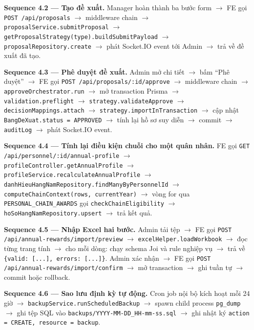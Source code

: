 \documentclass[../DoAn.tex]{subfiles}
\begin{document}
\textbf{Sequence 4.2 --- Tạo đề xuất.} Manager hoàn thành ba bước form $\rightarrow$ FE gọi \texttt{POST /api/proposals} $\rightarrow$ middleware chain $\rightarrow$ \texttt{proposalService.submitProposal} $\rightarrow$ \texttt{getProposalStrategy(type).buildSubmitPayload} $\rightarrow$ \texttt{proposalRepository.create} $\rightarrow$ phát Socket.IO event tới Admin $\rightarrow$ trả về đề xuất đã tạo.

\textbf{Sequence 4.3 --- Phê duyệt đề xuất.} Admin mở chi tiết $\rightarrow$ bấm ``Phê duyệt'' $\rightarrow$ FE gọi \texttt{POST /api/proposals/:id/approve} $\rightarrow$ middleware chain $\rightarrow$ \texttt{approveOrchestrator.run} $\rightarrow$ mở transaction Prisma $\rightarrow$ \texttt{validation.preflight} $\rightarrow$ \texttt{strategy.validateApprove} $\rightarrow$ \texttt{decisionMappings.attach} $\rightarrow$ \texttt{strategy.importInTransaction} $\rightarrow$ cập nhật \texttt{BangDeXuat.status = APPROVED} $\rightarrow$ tính lại hồ sơ suy diễn $\rightarrow$ commit $\rightarrow$ \texttt{auditLog} $\rightarrow$ phát Socket.IO event.

\textbf{Sequence 4.4 --- Tính lại điều kiện chuỗi cho một quân nhân.} FE gọi \texttt{GET /api/personnel/:id/annual-profile} $\rightarrow$ \texttt{profileController.getAnnualProfile} $\rightarrow$ \texttt{profileService.recalculateAnnualProfile} $\rightarrow$ \texttt{danhHieuHangNamRepository.findManyByPersonnelId} $\rightarrow$ \texttt{computeChainContext(rows, currentYear)} $\rightarrow$ vòng for qua \texttt{PERSONAL\_CHAIN\_AWARDS} gọi \texttt{checkChainEligibility} $\rightarrow$ \texttt{hoSoHangNamRepository.upsert} $\rightarrow$ trả kết quả.

\textbf{Sequence 4.5 --- Nhập Excel hai bước.} Admin tải tệp $\rightarrow$ FE gọi \texttt{POST /api/annual-rewards/import/preview} $\rightarrow$ \texttt{excelHelper.loadWorkbook} $\rightarrow$ đọc từng trang tính $\rightarrow$ cho mỗi dòng: chạy schema Joi và rule nghiệp vụ $\rightarrow$ trả về \texttt{\{valid: [...], errors: [...]\}}. Admin xác nhận $\rightarrow$ FE gọi \texttt{POST /api/annual-rewards/import/confirm} $\rightarrow$ mở transaction $\rightarrow$ ghi tuần tự $\rightarrow$ commit hoặc rollback.

\textbf{Sequence 4.6 --- Sao lưu định kỳ tự động.} Cron job nội bộ kích hoạt mỗi 24 giờ $\rightarrow$ \texttt{backupService.runScheduledBackup} $\rightarrow$ spawn child process \texttt{pg\_dump} $\rightarrow$ ghi tệp SQL vào \texttt{backups/YYYY-MM-DD\_HH-mm-ss.sql} $\rightarrow$ ghi nhật ký \texttt{action = CREATE, resource = backup}.
\end{document}
